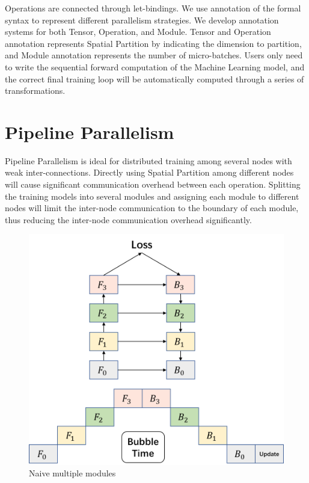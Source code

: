 \documentclass[sigplan, nonacm]{acmart}\settopmatter{printfolios=true,printccs=false,printacmref=false}
\begin{document}
Operations are connected through let-bindings. We use annotation of the formal syntax to represent different parallelism strategies. We develop annotation systems for both Tensor, Operation, and Module. Tensor and Operation annotation represents Spatial Partition by indicating the dimension to partition, and Module annotation represents the number of micro-batches. Users only need to write the sequential forward computation of the Machine Learning model, and the correct final training loop will be automatically computed through a series of transformations.
 \section{Pipeline Parallelism} \label{pipelineparallism}
 Pipeline Parallelism is ideal for distributed training among several nodes with weak inter-connections. Directly using Spatial Partition among different nodes will cause significant communication overhead between each operation. Splitting the training models into several modules and assigning each module to different nodes will limit the inter-node communication to the boundary of each module, thus reducing the inter-node communication overhead significantly.\par
 \begin{figure}[htbp]
  \centering
  \includegraphics[scale=0.4]{NormalPipeline}
  \caption{Naive multiple modules}
  \label{fig:multiplemodule}
\end{figure}
\end{document}
